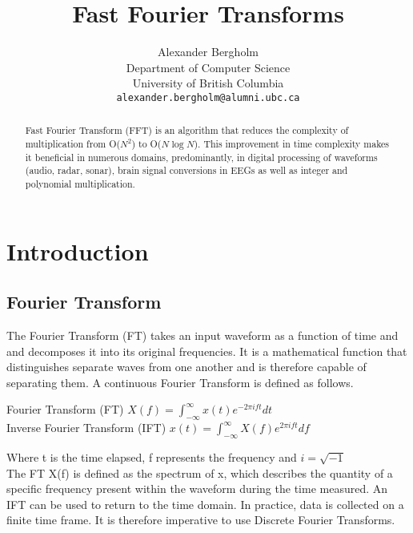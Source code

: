 \documentclass{article}
\title{Fast Fourier Transforms}
\author{%
  Alexander Bergholm \\
  Department of Computer Science\\
  University of British Columbia\\
  \texttt{alexander.bergholm@alumni.ubc.ca} \\
}
\begin{document}
\maketitle

\begin{abstract}
  Fast Fourier Transform (FFT) is an algorithm that reduces the complexity of multiplication from O($N^{2}$) to O($N\log N$). This improvement in time complexity makes it beneficial in numerous domains, predominantly, in digital processing of waveforms (audio, radar, sonar), brain signal conversions in EEGs as well as integer and polynomial multiplication.
\end{abstract}

\section{Introduction}
%
\subsection{Fourier Transform}
The Fourier Transform (FT) takes an input waveform as a function of time and and decomposes it into its original frequencies. It is a mathematical function that distinguishes separate waves from one another and is therefore capable of separating them. A continuous Fourier Transform is defined as follows. \\
\begin{center} 
Fourier Transform (FT)
$X(f) = \int_{-\infty}^{\infty} x(t)e^{-2\pi ift} dt$ \\
Inverse Fourier Transform (IFT)
$x(t) = \int_{-\infty}^{\infty} X(f)e^{2\pi ift} df$
\end{center}
Where t is the time elapsed, f represents the frequency and $i = \sqrt{-1}$ \\
The FT X(f) is defined as the spectrum of x, which describes the quantity of a specific frequency present within the waveform during the time measured.
An IFT can be used to return to the time domain.
In practice, data is collected on a finite time frame. It is therefore imperative to use Discrete Fourier Transforms.
\end{document}

